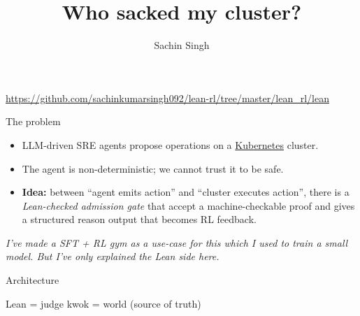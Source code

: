 \documentclass[10pt,aspectratio=169]{beamer}
\title{Who sacked my cluster?}
\author{Sachin Singh}
\date{}
\begin{document}
\begin{frame}
  \titlepage
  \vspace{-1.0em}
  \centerline{\small\url{https://github.com/sachinkumarsingh092/lean-rl/tree/master/lean_rl/lean}}
\end{frame}

\begin{frame}{The problem}
\begin{itemize}\itemsep0.4em
  \item LLM-driven SRE agents propose operations on a \hyperlink{glossary}{Kubernetes} cluster.
  \item The agent is non-deterministic; we cannot trust it to be safe.
  \item \textbf{Idea:} between ``agent emits action'' and ``cluster executes action'',
        there is a \emph{Lean-checked admission gate} that accept a machine-checkable
        proof and gives a structured reason output that becomes RL feedback.
\end{itemize}
\vspace{0.6em}
\begin{center}
\itshape I've made a SFT + RL gym as a use-case for this which I used to train a small model. But I've only explained the Lean side here.
\end{center}
\end{frame}

\begin{frame}{Architecture}
\centering
{}
\vspace{0.6em}
\centerline{\small Lean = judge \quad\textbar\quad kwok = world (source of truth)}
\end{frame}
\end{document}
